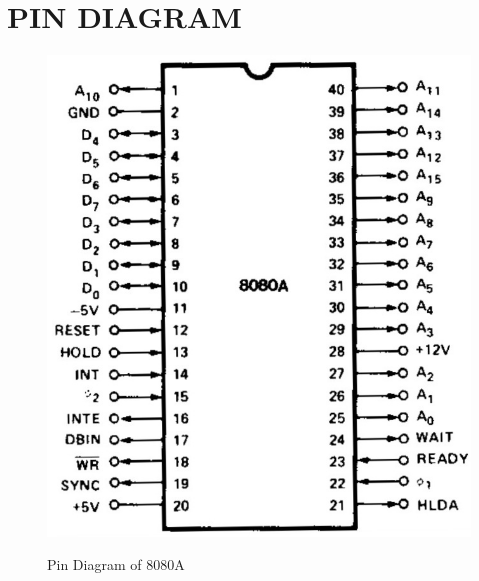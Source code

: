 \documentclass[conference]{IEEEtran}
\begin{document}
\section{{\large PIN DIAGRAM}}
\begin{figure}[!h]
\begin{center}
{\scalebox{0.5} {\includegraphics{pin.jpg}}}
\caption{Pin Diagram of 8080A}
\end{center}
\end{figure}
\end{document}
